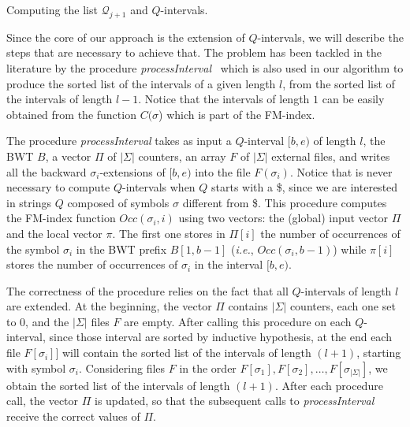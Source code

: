 \documentclass[runningheads,envcountsame,a4paper]{llncs}
\makeatletter
\newcommand{\paragrafo}{%
  \@startsection{paragraph}{4}{\z@ }{-7\p@ \@plus -4\p@ \@minus -4\p@
  }{-0.5em \@plus -0.22em \@minus -0.1em}{\normalfont \normalsize \itshape
  }
}
\newcommand{\notaestesa}[2]{%
 \marginpar{\color{red!75!black}\textbf{\texttimes}}%
 {\color{red!75!black}%
 [\,\textbullet\,\textsf{\textbf{#1:}} %
 \textsf{\footnotesize#2}\,\textbullet\,]}%
}
\newcommand{\YP}[1]{\notaestesa{YP}{#1}}
\newcommand{\ie}{\textit{i.e.}\xspace}
\newcommand{\Occ}{\ensuremath{\textit{Occ}}}
\makeatother
\begin{document}


\paragrafo{Computing  the list $\mathcal{Q}_{j+1} $ and $Q$-intervals.}

Since the core of our approach is the extension of $Q$-intervals, we will
describe the steps that are necessary to achieve that.
The problem has been tackled in the literature by
the procedure \emph{processInterval}~\cite{Cox2012} which is also used in our algorithm to produce the sorted list
of the intervals of a given length $l$, from the
sorted list of the intervals of length $l-1$. Notice that the intervals of length $1$
can be easily obtained from the  function $C(\sigma$) which is part of the FM-index.

The procedure \emph{processInterval} takes as input a $Q$-interval $[b,e)$ of
length $l$, the BWT $B$, a vector $\Pi$ of $|\Sigma|$ counters, an array $F$ of
$|\Sigma|$ external files, and writes all the backward $\sigma_i$-extensions of
$[b,e)$ into the file $F(\sigma_{i})$.
Notice that is never necessary to compute $Q$-intervals when $Q$ starts with a \$, since we are interested in strings $Q$ composed of symbols $\sigma$ different from \$.
This procedure computes the FM-index function $\Occ(\sigma_i, i)$ using two
vectors: the (global) input vector $\Pi$ and the local vector $\pi$.
The first one stores in $\Pi[i]$ the number of occurrences of  the symbol
$\sigma_i$ in the BWT prefix $B[1,b-1]$ (\ie, $\Occ(\sigma_{i}, b-1)$) while
$\pi[i]$ stores the number of occurrences of $\sigma_i$ in the interval $[b,e)$.

The correctness of the procedure relies on the fact that all $Q$-intervals of
length $l$ are extended.
At the beginning, the vector $\Pi$ contains $|\Sigma|$ counters, each one set to $0$, and the $|\Sigma|$ files $F$ are empty.
After calling this procedure on each $Q$-interval, since those interval are
sorted by inductive hypothesis,  at the end each file $F[\sigma_{i}]]$ will
contain the sorted list of the intervals of length $(l+1)$, starting with symbol
$\sigma_i$.
Considering files $F$ in the order $F[\sigma_{1}], F[\sigma_{2}], \ldots
,F[\sigma_{|\Sigma|}]$, we obtain the sorted list of the intervals of length
$(l+1)$.
After each procedure call, the vector $\Pi$ is updated, so that the subsequent
calls to \emph{processInterval} receive the correct values of $\Pi$.
\end{document}
